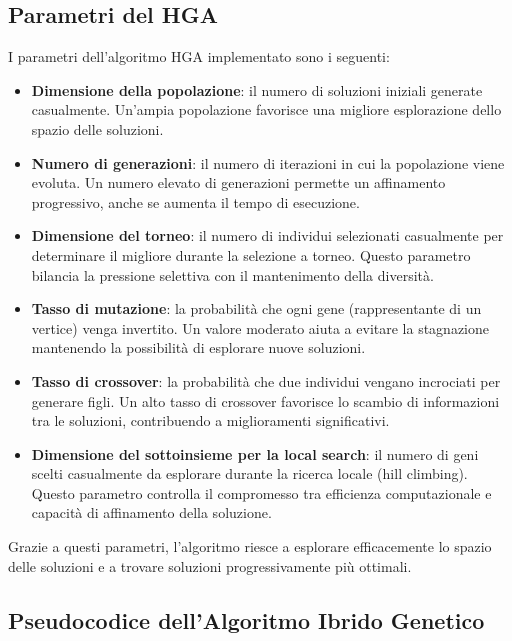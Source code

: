 \documentclass[a4paper,12pt]{article}
\begin{document}
\subsection{Parametri del HGA}
I parametri dell'algoritmo HGA implementato sono i seguenti:
\begin{itemize}
    \item \textbf{Dimensione della popolazione}: il numero di soluzioni iniziali generate casualmente. Un'ampia popolazione favorisce una migliore esplorazione dello spazio delle soluzioni.
    \item \textbf{Numero di generazioni}: il numero di iterazioni in cui la popolazione viene evoluta. Un numero elevato di generazioni permette un affinamento progressivo, anche se aumenta il tempo di esecuzione.
    \item \textbf{Dimensione del torneo}: il numero di individui selezionati casualmente per determinare il migliore durante la selezione a torneo. Questo parametro bilancia la pressione selettiva con il mantenimento della diversità.
    \item \textbf{Tasso di mutazione}: la probabilità che ogni gene (rappresentante di un vertice) venga invertito. Un valore moderato aiuta a evitare la stagnazione mantenendo la possibilità di esplorare nuove soluzioni.
    \item \textbf{Tasso di crossover}: la probabilità che due individui vengano incrociati per generare figli. Un alto tasso di crossover favorisce lo scambio di informazioni tra le soluzioni, contribuendo a miglioramenti significativi.
    \item \textbf{Dimensione del sottoinsieme per la local search}: il numero di geni scelti casualmente da esplorare durante la ricerca locale (hill climbing). Questo parametro controlla il compromesso tra efficienza computazionale e capacità di affinamento della soluzione.
\end{itemize}
Grazie a questi parametri, l'algoritmo riesce a esplorare efficacemente lo spazio delle soluzioni e a trovare soluzioni progressivamente più ottimali.

\subsection{Pseudocodice dell'Algoritmo Ibrido Genetico}
\end{document}
